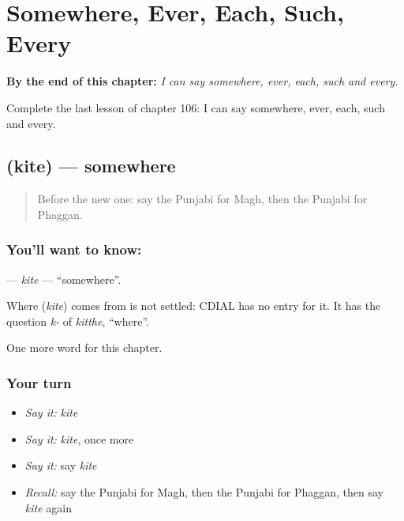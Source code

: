 
\chapter{Somewhere, Ever, Each, Such, Every}
\label{ch:pa-somewhere-ever-each-such-every}

\begin{chapteropening}
\textbf{By the end of this chapter:} \emph{I can say somewhere, ever, each, such and every.}

Complete the last lesson of chapter 106: I can say somewhere, ever, each, such and every.
\end{chapteropening}

\section[\texorpdfstring{\pa{ਕਿਤੇ} (kite)}{ਕਿਤੇ (kite)}]{ (kite) — somewhere}

\label{lesson:PA-C106-kite}



\begin{quote}
Before the new one: say the Punjabi for Magh, then the Punjabi for Phaggan.
\end{quote}

\subsection*{You'll want to know: }
\textbf{} — \emph{kite} — \textquotedblleft{}somewhere\textquotedblright{}.

\begin{cousinweb}
Where \textbf{} (\emph{kite}) comes from is not settled: CDIAL has no entry for it. It has the question \emph{k-} of \emph{kitthe}, \textquotedblleft{}where\textquotedblright{}.
\end{cousinweb}

\begin{grammarlens}[title={What you've built}]
One more word for this chapter.
\end{grammarlens}

\subsection*{Your turn}
\begin{itemize}
\raggedright
  \item \emph{Say it:} \emph{kite}
  \item \emph{Say it:} \emph{kite}, once more
  \item \emph{Say it:} say \emph{kite}
  \item \emph{Recall:} say the Punjabi for Magh, then the Punjabi for Phaggan, then say \emph{kite} again
\end{itemize}

